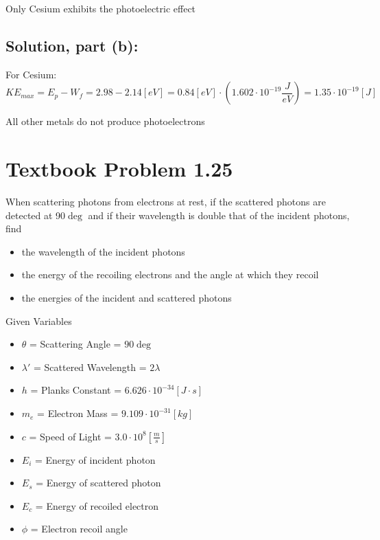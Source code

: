 \documentclass[12pt]{article}
\begin{document}
        Only Cesium exhibits the photoelectric effect

    \subsection*{Solution, part (b):}
        For Cesium:
        \begin{equation}
            KE_{max} = E_{p} - W_f = 2.98 - 2.14 [eV] = 0.84 [eV] \cdot (1.602 \cdot 10^{-19} \frac{J}{eV}) = 1.35 \cdot 10^{-19} [J]
        \end{equation}

        All other metals do not produce photoelectrons
            
\section*{Textbook Problem 1.25}
    When scattering photons from electrons at rest, if the scattered photons are detected at 90$\deg$ and if their wavelength is double that of the incident photons, find
    \begin{itemize}
        \item [(a)] the wavelength of the incident photons
        \item [(b)] the energy of the recoiling electrons and the angle at which they recoil
        \item [(c)] the energies of the incident and scattered photons
    \end{itemize}

    Given Variables
    \begin{itemize}
        \item $\theta$ = Scattering Angle = $90 \deg$
        \item $\lambda'$ = Scattered Wavelength = $2 \lambda$
        \item $h$ = Planks Constant = $6.626 \cdot 10^{-34} [J \cdot s]$
        \item $m_e$ = Electron Mass = $9.109 \cdot 10^{-31} [kg]$
        \item $c$ = Speed of Light = $3.0 \cdot 10^8 [\frac{m}{s}]$    
        \item $E_i$ = Energy of incident photon 
        \item $E_s$ = Energy of scattered photon
        \item $E_c$ = Energy of recoiled electron
        \item $\phi$ = Electron recoil angle
    \end{itemize}
    
\end{document}
